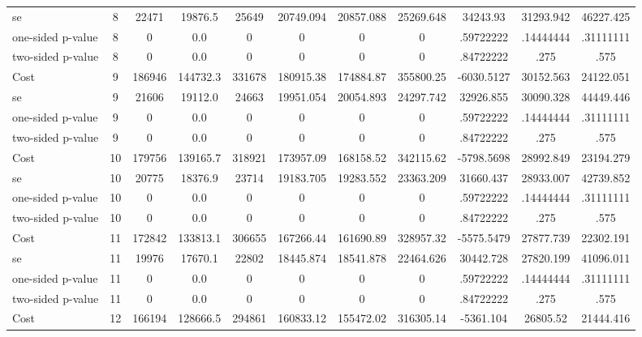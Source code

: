 \begin{tabular}{lcccccccccc}
se 				  &         8 &     22471 &   19876.5 &     25649 & 20749.094 & 20857.088 & 25269.648 & 34243.93 & 31293.942 & 46227.425 \\  
one-sided p-value &         8 &         0 &       0.0 &         0 & 0 & 0 & 0 & .59722222 & .14444444 & .31111111 \\  
two-sided p-value &         8 &         0 &       0.0 &         0 & 0 & 0 & 0 & .84722222 & .275 & .575 \\  
Cost 			  &         9 &    186946 &  144732.3 &    331678 & 180915.38 & 174884.87 & 355800.25 & -6030.5127 & 30152.563 & 24122.051 \\  
se 				  &         9 &     21606 &   19112.0 &     24663 & 19951.054 & 20054.893 & 24297.742 & 32926.855 & 30090.328 & 44449.446 \\  
one-sided p-value &         9 &         0 &       0.0 &         0 & 0 & 0 & 0 & .59722222 & .14444444 & .31111111 \\  
two-sided p-value &         9 &         0 &       0.0 &         0 & 0 & 0 & 0 & .84722222 & .275 & .575 \\  
Cost 			  &        10 &    179756 &  139165.7 &    318921 & 173957.09 & 168158.52 & 342115.62 & -5798.5698 & 28992.849 & 23194.279 \\  
se 				 &        10 &     20775 &   18376.9 &     23714 & 19183.705 & 19283.552 & 23363.209 & 31660.437 & 28933.007 & 42739.852 \\  
one-sided p-value&        10 &         0 &       0.0 &         0 & 0 & 0 & 0 & .59722222 & .14444444 & .31111111 \\  
two-sided p-value&        10 &         0 &       0.0 &         0 & 0 & 0 & 0 & .84722222 & .275 & .575 \\  
Cost 			  &        11 &    172842 &  133813.1 &    306655 & 167266.44 & 161690.89 & 328957.32 & -5575.5479 & 27877.739 & 22302.191 \\  
se 				 &        11 &     19976 &   17670.1 &     22802 & 18445.874 & 18541.878 & 22464.626 & 30442.728 & 27820.199 & 41096.011 \\  
one-sided p-value&        11 &         0 &       0.0 &         0 & 0 & 0 & 0 & .59722222 & .14444444 & .31111111 \\  
two-sided p-value&        11 &         0 &       0.0 &         0 & 0 & 0 & 0 & .84722222 & .275 & .575 \\  
Cost 			  &        12 &    166194 &  128666.5 &    294861 & 160833.12 & 155472.02 & 316305.14 & -5361.104 & 26805.52 & 21444.416 \\  

\end{tabular}

